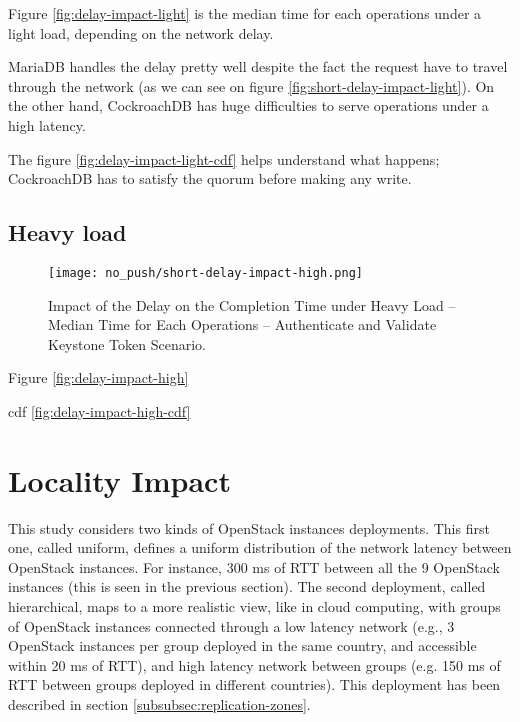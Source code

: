 Figure \ref{fig:delay-impact-light} is the median time for each operations under a light load, depending on the network delay.

MariaDB handles the delay pretty well despite the fact the request have to travel through the network (as we can see on figure \ref{fig:short-delay-impact-light}). On the other hand, CockroachDB has huge difficulties to serve operations under a high latency.


The figure \ref{fig:delay-impact-light-cdf} helps understand what happens; CockroachDB has to satisfy the quorum before making any write.

\subsection{Heavy load}

\begin{figure}[H]
  \vspace{-10pt}
  \centering
  \centerline{\texttt{[image: no\_push/short-delay-impact-high.png]}}
  \vspace{-5pt}
  \caption{Impact of the Delay on the Completion Time under Heavy Load – Median Time for Each Operations – Authenticate and Validate Keystone Token Scenario.}
  \vspace{-5pt}
  \label{fig:short-delay-impact-high}
\end{figure}

Figure \ref{fig:delay-impact-high}

cdf \ref{fig:delay-impact-high-cdf}

\section{Locality Impact}

This study considers two kinds of OpenStack instances deployments. This first one, called uniform, defines a uniform distribution of the network latency between OpenStack instances. For instance, 300 ms of RTT between all the 9 OpenStack instances (this is seen in the previous section). The second deployment, called hierarchical, maps to a more realistic view, like in cloud computing, with groups of OpenStack instances connected through a low latency network (e.g., 3 OpenStack instances per group deployed in the same country, and accessible within 20 ms of RTT), and high latency network between groups (e.g. 150 ms of RTT between groups deployed in different countries). This deployment has been described in section \ref{subsubsec:replication-zones}.

